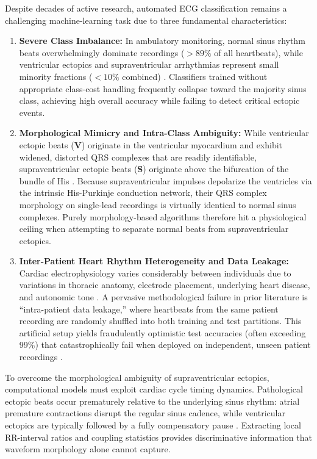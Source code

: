 \documentclass[conference]{IEEEtran}
\begin{document}
Despite decades of active research, automated ECG classification remains a challenging machine-learning task due to three fundamental characteristics:
\begin{enumerate}
    \item \textbf{Severe Class Imbalance:} In ambulatory monitoring, normal sinus rhythm beats overwhelmingly dominate recordings ($>89\%$ of all heartbeats), while ventricular ectopics and supraventricular arrhythmias represent small minority fractions ($<10\%$ combined) \cite{luz2016ecg}. Classifiers trained without appropriate class-cost handling frequently collapse toward the majority sinus class, achieving high overall accuracy while failing to detect critical ectopic events.
    \item \textbf{Morphological Mimicry and Intra-Class Ambiguity:} While ventricular ectopic beats (\textbf{V}) originate in the ventricular myocardium and exhibit widened, distorted QRS complexes that are readily identifiable, supraventricular ectopic beats (\textbf{S}) originate above the bifurcation of the bundle of His \cite{josephson2015clinical}. Because supraventricular impulses depolarize the ventricles via the intrinsic His-Purkinje conduction network, their QRS complex morphology on single-lead recordings is virtually identical to normal sinus complexes. Purely morphology-based algorithms therefore hit a physiological ceiling when attempting to separate normal beats from supraventricular ectopics.
    \item \textbf{Inter-Patient Heart Rhythm Heterogeneity and Data Leakage:} Cardiac electrophysiology varies considerably between individuals due to variations in thoracic anatomy, electrode placement, underlying heart disease, and autonomic tone \cite{sornmo2005bioelectrical}. A pervasive methodological failure in prior literature is ``intra-patient data leakage,'' where heartbeats from the same patient recording are randomly shuffled into both training and test partitions. This artificial setup yields fraudulently optimistic test accuracies (often exceeding 99\%) that catastrophically fail when deployed on independent, unseen patient recordings \cite{dechazal2004automatic}.
\end{enumerate}

To overcome the morphological ambiguity of supraventricular ectopics, computational models must exploit cardiac cycle timing dynamics. Pathological ectopic beats occur prematurely relative to the underlying sinus rhythm: atrial premature contractions disrupt the regular sinus cadence, while ventricular ectopics are typically followed by a fully compensatory pause \cite{josephson2015clinical}. Extracting local RR-interval ratios and coupling statistics provides discriminative information that waveform morphology alone cannot capture.
\end{document}
